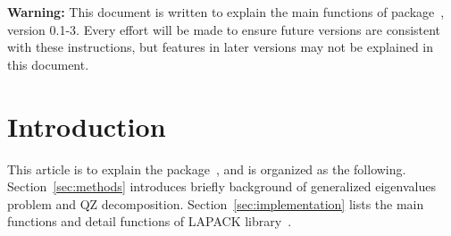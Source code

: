 
{\color{red} \bf Warning:} This document is written to explain the main
functions of  package~\citep{Chen2013QZpackage}, version 0.1-3.
Every effort will be made to ensure future versions are consistent with
these instructions, but features in later versions may not be explained
in this document.


\section[Introduction]{Introduction}
\label{sec:introduction}


This article is to explain the  package~\citep{Chen2013QZpackage}, and
is organized as the following. Section~\ref{sec:methods} introduces briefly
background of generalized eigenvalues problem and QZ decomposition.
Section~\ref{sec:implementation} lists the main functions and detail
 functions of LAPACK library~\citep{laug}.

